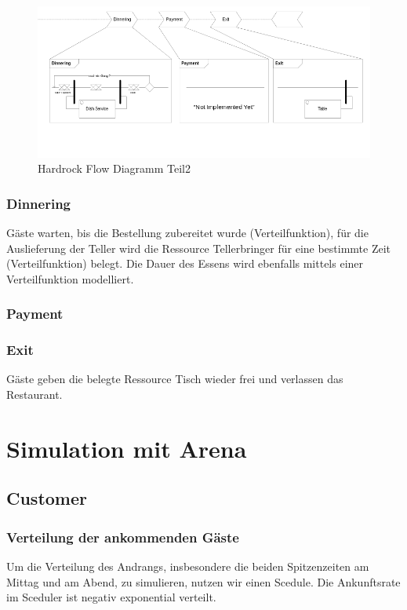 \documentclass[ngerman,a4paper,12pt]{scrreprt}
\begin{document}
\begin{landscape}
		
		\begin{figure}[H]
				\includegraphics[width=1.4\textwidth]{img/flowDiagramm2-v1.png}
				\caption[Hardrock Flow Diagramm Teil2]{Hardrock Flow Diagramm Teil2}
				\label{flowDiagramm2}
		\end{figure}
		
		\subsection{Dinnering}
		Gäste warten, bis die Bestellung zubereitet wurde (Verteilfunktion), für die Auslieferung der Teller wird die Ressource Tellerbringer für eine bestimmte Zeit (Verteilfunktion) belegt. Die Dauer des Essens wird ebenfalls mittels einer Verteilfunktion modelliert.
		
		\subsection{Payment}
		
		
		\subsection{Exit}
		Gäste geben die belegte Ressource Tisch wieder frei und verlassen das Restaurant.
		
\end{landscape}



\chapter{Simulation mit Arena}
	\section{Customer}			
		\subsection{Verteilung der ankommenden Gäste}
			Um die Verteilung des Andrangs, insbesondere die beiden Spitzenzeiten am Mittag und am Abend, zu simulieren, nutzen wir einen Scedule.	
			Die Ankunftsrate im Sceduler ist negativ exponential verteilt.
	
\end{document}
